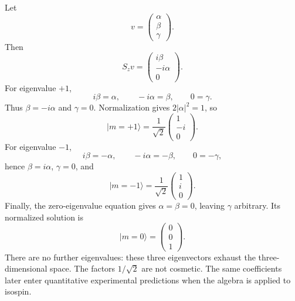 Let
\begin{equation}
v=
\begin{pmatrix}
\alpha\\
\beta\\
\gamma
\end{pmatrix}.
\end{equation}
Then
\begin{equation}
S_zv
=
\begin{pmatrix}
i\beta\\
-i\alpha\\
0
\end{pmatrix}.
\end{equation}
For eigenvalue \(+1\),
\begin{equation}
i\beta=\alpha,
\qquad
-i\alpha=\beta,
\qquad
0=\gamma.
\end{equation}
Thus \(\beta=-i\alpha\) and \(\gamma=0\). Normalization gives \(2|\alpha|^2=1\), so
\begin{equation}
|m=+1\rangle
=
\frac{1}{\sqrt2}
\begin{pmatrix}
1\\
-i\\
0
\end{pmatrix}.
\end{equation}
For eigenvalue \(-1\),
\begin{equation}
i\beta=-\alpha,
\qquad
-i\alpha=-\beta,
\qquad
0=-\gamma,
\end{equation}
hence \(\beta=i\alpha\), \(\gamma=0\), and
\begin{equation}
|m=-1\rangle
=
\frac{1}{\sqrt2}
\begin{pmatrix}
1\\
i\\
0
\end{pmatrix}.
\end{equation}
Finally, the zero-eigenvalue equation gives \(\alpha=\beta=0\), leaving \(\gamma\) arbitrary. Its normalized solution is
\begin{equation}
|m=0\rangle
=
\begin{pmatrix}
0\\
0\\
1
\end{pmatrix}.
\end{equation}
There are no further eigenvalues: these three eigenvectors exhaust the three-dimensional space. The factors \(1/\sqrt2\) are not cosmetic. The same coefficients later enter quantitative experimental predictions when the algebra is applied to isospin.

